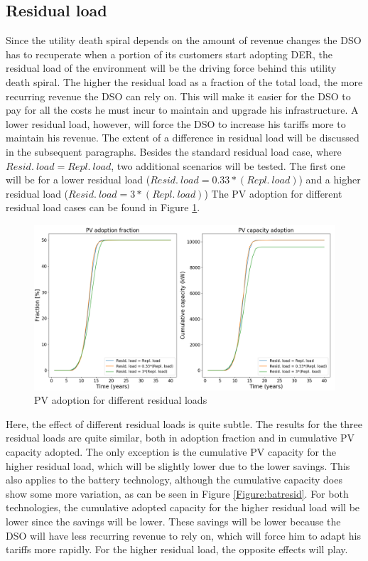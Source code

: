 \subsection{Residual load}
Since the utility death spiral depends on the amount of revenue changes the DSO has to recuperate when a portion of its customers start adopting DER, the residual load of the environment will be the driving force behind this utility death spiral. The higher the residual load as a fraction of the total load, the more recurring revenue the DSO can rely on. This will make it easier for the DSO to pay for all the costs he must incur to maintain and upgrade his infrastructure. A lower residual load, however, will force the DSO to increase his tariffs more to maintain his revenue. The extent of a difference in residual load will be discussed in the subsequent paragraphs. Besides the standard residual load case, where $Resid.\: load = Repl. \:load$, two additional scenarios will be tested. The first one will be for a lower residual load ($Resid. \: load = 0.33*(Repl.\: load)$) and a higher residual load  ($Resid. \: load = 3*(Repl. \: load)$)
\newline \newline \noindent
The PV adoption for different residual load cases can be found in Figure \ref{Figure:pvresid}. 
\begin{figure}[h!]
\centering
\includegraphics[width=12cm]{ModelAnalysis/PVresid.png}
\caption{PV adoption for different residual loads}
\label{Figure:pvresid}
\end{figure}
 \noindent
Here, the effect of different residual loads is quite subtle. The results for the three residual loads are quite similar, both in adoption fraction and in cumulative PV capacity adopted. The only exception is the cumulative PV capacity for the higher residual load, which will be slightly lower due to the lower savings. This also applies to the battery technology, although the cumulative capacity does show some more variation, as can be seen in Figure \ref{Figure:batresid}. For both technologies, the cumulative adopted capacity for the higher residual load will be lower since the savings will be lower. These savings will be lower because the DSO will have less recurring revenue to rely on, which will force him to adapt his tariffs more rapidly. For the higher residual load, the opposite effects will play. 
